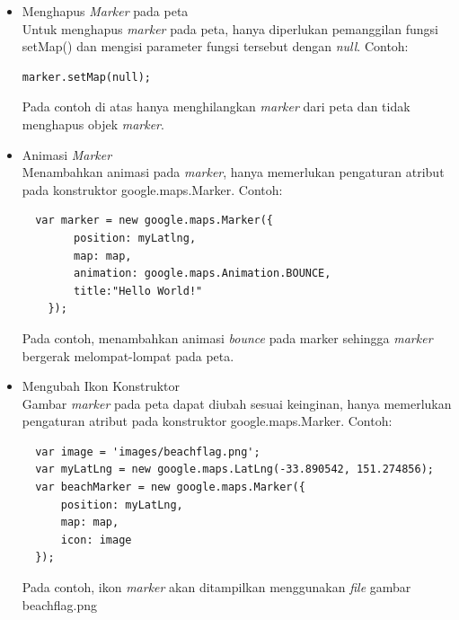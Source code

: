\begin{enumerate}
\begin{itemize}
  \item Menghapus \textit{Marker} pada peta\\
  Untuk menghapus \textit{marker} pada peta, hanya diperlukan pemanggilan
  fungsi setMap() dan mengisi parameter fungsi tersebut dengan \textit{null}.
  Contoh:
\begin{verbatim}
marker.setMap(null);
\end{verbatim}
  Pada contoh di atas hanya menghilangkan \textit{marker} dari peta dan tidak
  menghapus objek \textit{marker}.
  
  \item Animasi \textit{Marker} \\
  Menambahkan animasi pada \textit{marker}, hanya memerlukan pengaturan atribut
  pada konstruktor google.maps.Marker. Contoh:
\begin{verbatim}
  var marker = new google.maps.Marker({
	    position: myLatlng,
	    map: map,
	    animation: google.maps.Animation.BOUNCE,
	    title:"Hello World!"
	});
\end{verbatim}
  Pada contoh, menambahkan animasi \textit{bounce} pada marker sehingga
  \textit{marker} bergerak melompat-lompat pada peta. 
  
  \item Mengubah Ikon Konstruktor\\
  Gambar \textit{marker} pada peta dapat diubah sesuai keinginan, hanya
  memerlukan pengaturan atribut pada konstruktor google.maps.Marker. Contoh:
\begin{verbatim}
  var image = 'images/beachflag.png';
  var myLatLng = new google.maps.LatLng(-33.890542, 151.274856);
  var beachMarker = new google.maps.Marker({
      position: myLatLng,
      map: map,
      icon: image
  });
\end{verbatim}
  Pada contoh, ikon \textit{marker} akan ditampilkan menggunakan \textit{file}
  gambar beachflag.png
  

\end{itemize}
\end{enumerate}

